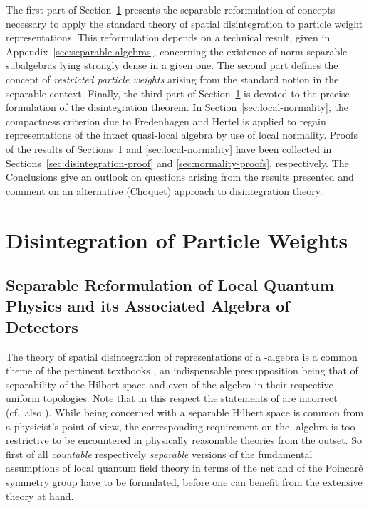 \documentclass[a4paper,a4paper]{article}
\numberwithin{equation}{section}
\providecommand{\Afrak}{\mathfrak{A}}
\providecommand{\Oscr}{\mathscr{O}}
\providecommand{\Afrakbar}{\overline{\mathfrak{A}}}
\providecommand{\Hscrbar}{\overline{\mathscr{H}}}
\providecommand{\pibar}{\overline{\pi}}
\providecommand{\Poin}{\mathsf{P}_{\negthinspace +}^\uparrow}
\providecommand{\AO}{\mathfrak{A} ( \mathscr{O} )}
\theoremstyle{definition}
\theoremstyle{plain}
\theoremstyle{remark}
\theoremstyle{assumption}
\begin{document}
  The first part of Section~\ref{sec:disintegration} presents the
  separable reformulation of concepts necessary to apply the standard
  theory of spatial disintegration to particle weight representations.
  This reformulation depends on a technical result, given in
  Appendix~\ref{sec:separable-algebras}, concerning the existence of
  norm-separable \coordHE{}-subalgebras lying strongly dense in a given
  one. The second part defines the concept of \emph{restricted
    particle weights} arising from the standard notion in the
  separable context. Finally, the third part of
  Section~\ref{sec:disintegration} is devoted to the precise
  formulation of the disintegration theorem. In
  Section~\ref{sec:local-normality}, the compactness criterion due to
  Fredenhagen and Hertel is applied to regain representations of the
  intact quasi-local algebra \myHighlight{$\Afrak$}\coordHE{} by use of local normality.
  Proofs of the results of Sections~\ref{sec:disintegration} and
  \ref{sec:local-normality} have been collected in
  Sections~\ref{sec:disintegration-proof} and
  \ref{sec:normality-proofs}, respectively. The Conclusions give an
  outlook on questions arising from the results presented and comment
  on an alternative (Choquet) approach to disintegration theory.


\section{Disintegration of Particle Weights}
  \label{sec:disintegration}

\subsection{Separable Reformulation of Local Quantum Physics and its
  Associated Algebra of Detectors}
  \label{subsec:separable-reformulation}
  
  The theory of spatial disintegration of representations \myHighlight{$( \pibar ,
  \Hscrbar )$}\coordHE{} of a \coordHE{}-algebra \myHighlight{$\Afrakbar$}\coordHE{} is a common theme of the
  pertinent textbooks \cite{dixmier:1981,dixmier:1982,takesaki:1979,%
    pedersen:1979,bratteli/robinson:1987}, an indispensable
  presupposition being that of separability of the Hilbert space
  \myHighlight{$\Hscrbar$}\coordHE{} and even of the algebra \myHighlight{$\Afrakbar$}\coordHE{} in their respective
  uniform topologies. Note that in this respect the statements of
  \cite[Section~4.4]{bratteli/robinson:1987} are incorrect (cf.~also
  \cite[Corrigenda]{bratteli/robinson:1997}). While being concerned
  with a separable Hilbert space is common from a physicist's point of
  view, the corresponding requirement on the \coordHE{}-algebra \myHighlight{$\Afrakbar$}\coordHE{}
  is too restrictive to be encountered in physically reasonable
  theories from the outset. So first of all \emph{countable}
  respectively \emph{separable} versions of the fundamental
  assumptions of local quantum field theory in terms of the net \myHighlight{$\Oscr
  \mapsto \AO$}\coordHE{} and of the Poincar\'e symmetry group \myHighlight{$\Poin$}\coordHE{} have to be
  formulated, before one can benefit from the extensive theory at
  hand.
  
\end{document}
